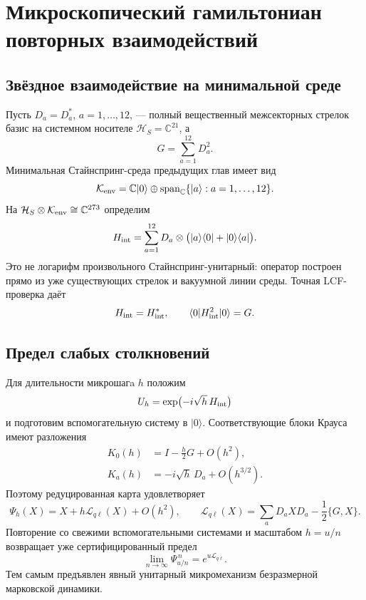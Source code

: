 \chapter{Микроскопический гамильтониан повторных взаимодействий}
\label{ch:v8-microscopic-repeated-interaction-hamiltonian-gate}

\section{Звёздное взаимодействие на минимальной среде}

Пусть $D_a=D_a^*$, $a=1,\ldots,12$, --- полный вещественный
межсекторных стрелок базис на системном носителе $\mathcal H_S=\mathbb C^{21}$, а
\begin{equation}
 G=\sum_{a=1}^{12}D_a^2.
\end{equation}
Минимальная Стайнспринг-среда предыдущих глав имеет вид
\begin{equation}
 \mathcal K_{\rm env}
 =\mathbb C|0\rangle\oplus
 \operatorname{span}_{\mathbb C}\{|a\rangle:a=1,\ldots,12\}.
\end{equation}
На $\mathcal H_S\otimes\mathcal K_{\rm env}\cong\mathbb C^{273}$ определим
\begin{equation}
 H_{\rm int}
 =\sum_{a=1}^{12}D_a\otimes
 \bigl(|a\rangle\langle0|+|0\rangle\langle a|\bigr).
 \label{eq:v8-star-interaction-hamiltonian}
\end{equation}
Это не логарифм произвольного Стайнспринг-унитарный: оператор построен прямо
из уже существующих стрелок и вакуумной линии среды. Точная LCF-проверка даёт
\begin{equation}
 H_{\rm int}=H_{\rm int}^*,
 \qquad
 \langle0|H_{\rm int}^2|0\rangle=G.
 \label{eq:v8-star-interaction-second-moment}
\end{equation}

\section{Предел слабых столкновений}

Для длительности микрошагa $h$ положим
\begin{equation}
 U_h=\exp\bigl(-i\sqrt h\,H_{\rm int}\bigr)
\end{equation}
и подготовим вспомогательную систему в $|0\rangle$. Соответствующие блоки Крауса имеют
разложения
\begin{align}
 K_0(h)&=I-\frac h2G+O(h^2),\\
 K_a(h)&=-i\sqrt h\,D_a+O(h^{3/2}).
\end{align}
Поэтому редуцированная карта удовлетворяет
\begin{equation}
 \Psi_h(X)=X+h\mathcal L_{q\ell}(X)+O(h^2),
 \qquad
 \mathcal L_{q\ell}(X)
 =\sum_aD_aXD_a-\frac12\{G,X\}.
 \label{eq:v8-star-interaction-gksl-tangent}
\end{equation}
Повторение со свежими вспомогательными системами и масштабом $h=u/n$ возвращает уже
сертифицированный предел
\begin{equation}
 \lim_{n\to\infty}\Psi_{u/n}^{\,n}=e^{u\mathcal L_{q\ell}}.
\end{equation}
Тем самым предъявлен явный унитарный микромеханизм безразмерной
марковской динамики.

